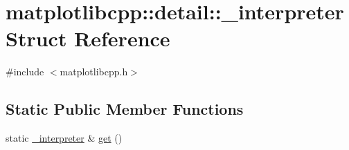\hypertarget{structmatplotlibcpp_1_1detail_1_1__interpreter}{}\section{matplotlibcpp\+::detail\+::\+\_\+interpreter Struct Reference}
\label{structmatplotlibcpp_1_1detail_1_1__interpreter}


{\ttfamily \#include $<$matplotlibcpp.\+h$>$}

\subsection*{Static Public Member Functions}
\begin{DoxyCompactItemize}
\item 
static \mbox{\hyperlink{structmatplotlibcpp_1_1detail_1_1__interpreter}{\+\_\+interpreter}} \& \mbox{\hyperlink{structmatplotlibcpp_1_1detail_1_1__interpreter_a3ddc4e50c23738307da3dc64c47cdbc0}{get}} ()
\end{DoxyCompactItemize}
